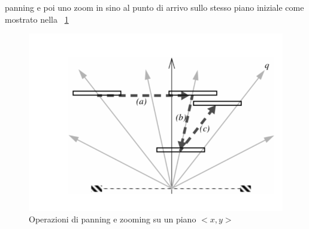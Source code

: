 {panning e poi uno zoom in sino al punto di arrivo sullo stesso piano iniziale come mostrato nella \figurename~\ref{fig:panning}
\begin{figure}[!htb]
	\begin{center}
		\hspace{-1 cm}
		\includegraphics[width=1 \linewidth]{figure/panning}
	\end{center}
	\caption{Operazioni di panning e zooming su un piano $<x,y>$\label{fig:panning}}
\end{figure}

}
